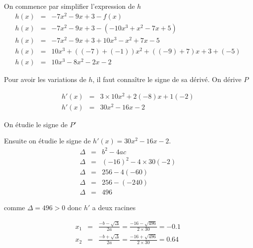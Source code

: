 \documentclass[a4paper,10pt, table]{/media/documents/Cours/Prof/Enseignements/tools/style/classDS}
\begin{document}
\begin{questions}
\begin{parts}
        \begin{solution}
            On commence par simplifier l'expression de $h$
            \begin{eqnarray*}
                h(x) & = & - 7 x^{  2 } - 9 x + 3 - f(x) \\
                h(x) & = & - 7 x^{  2 } - 9 x + 3 - ( - 10 x^{  3 } + x^{  2 } - 7 x + 5 ) \\ 
h(x) & = & - 7 x^{  2 } - 9 x + 3 + 10 x^{  3 } - x^{  2 } + 7 x - 5 \\ 
h(x) & = & 10 x^{  3 } + ( ( -7 ) + ( -1 ) ) x^{  2 } + ( ( -9 ) + 7 ) x + 3 + ( -5 ) \\ 
h(x) & = & 10 x^{  3 } - 8 x^{  2 } - 2 x - 2
            \end{eqnarray*}
            
        
            Pour avoir les variations de $h$, il faut connaître le signe de sa dérivé. On dérive $P$
            
            \begin{eqnarray*}
                h'(x) & = & 3 \times 10 x^{  2 } + 2 ( -8 ) x + 1 ( -2 ) \\ 
h'(x) & = & 30 x^{  2 } - 16 x - 2
            \end{eqnarray*}
            
            On étudie le signe de $P'$
            
            Ensuite on étudie le signe de $h'(x) = 30 x^{  2 } - 16 x - 2$.
        \begin{eqnarray*}
            \Delta & = & b^2-4ac \\
            \Delta & = & ( -16 )^{  2 } - 4 \times 30 ( -2 ) \\ 
\Delta & = & 256 - 4 ( -60 ) \\ 
\Delta & = & 256 - ( -240 ) \\ 
\Delta & = & 496
        \end{eqnarray*}

        
            comme $\Delta = 496 > 0$ donc $h'$ a deux racines

            \begin{eqnarray*}
                x_1 & = & \frac{-b - \sqrt{\Delta}}{2a} =  \frac{-16 - \sqrt{496}}{2 \times 30} = -0.1 \\
                x_2 & = & \frac{-b + \sqrt{\Delta}}{2a} =  \frac{-16 + \sqrt{496}}{2 \times 30} = 0.64
            \end{eqnarray*}



\end{solution}
\end{parts}
\end{questions}
\end{document}
